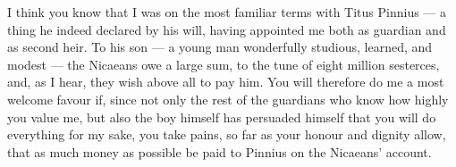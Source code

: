 

I think you know that I was on the most familiar terms with Titus Pinnius --- a thing he indeed declared by his will, having appointed me both as guardian and as second heir. To his son --- a young man wonderfully studious, learned, and modest --- the Nicaeans owe a large sum, to the tune of eight million sesterces, and, as I hear, they wish above all to pay him. You will therefore do me a most welcome favour if, since not only the rest of the guardians who know how highly you value me, but also the boy himself has persuaded himself that you will do everything for my sake, you take pains, so far as your honour and dignity allow, that as much money as possible be paid to Pinnius on the Nicaeans' account.

